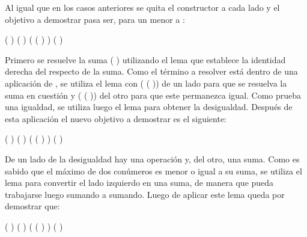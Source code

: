 \begin{AgdaAlign}
Al igual que en los casos anteriores se quita el constructor  a cada lado y el objetivo a demostrar pasa ser, para un  menor a :
\begin{center}
\AgdaFunction{[}  \AgdaFunction{]}  (  \AgdaFunction{+} ) ( ) \AgdaFunction{$\leq$} ( ( )  )  \AgdaFunction{+} ( )
\end{center}

Primero se resuelve la suma (  \AgdaFunction{+} ) utilizando el lema  que establece la identidad derecha del  respecto de la suma. Como el término a resolver está dentro de una aplicación de , se utiliza el lema  con ( ( )) de un lado para que se resuelva la suma en cuestión y ( ( )) del otro para que este permanezca igual. Como  prueba una igualdad, se utiliza luego el lema \AgdaFunction{$\sim\rightarrow\leq$} para obtener la desigualdad. Después de esta aplicación el nuevo objetivo a demostrar es el siguiente:
\begin{center}
\AgdaFunction{[}  \AgdaFunction{]}  ( ) ( ) \AgdaFunction{$\leq$} ( ( )  )  \AgdaFunction{+} ( )
\end{center}

De un lado de la desigualdad hay una operación  y, del otro, una suma. Como es sabido que el máximo de dos conúmeros es menor o igual a su suma, se utiliza el lema  para convertir el lado izquierdo en una suma, de manera que pueda trabajarse luego sumando a sumando. Luego de aplicar este lema queda por demostrar que:
\begin{center}
\AgdaFunction{[}  \AgdaFunction{]} ( ) \AgdaFunction{+} ( ) \AgdaFunction{$\leq$} ( ( )  )  \AgdaFunction{+} ( )
\end{center}


\end{AgdaAlign}
